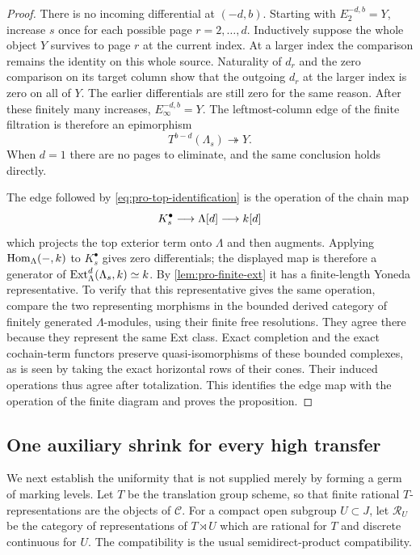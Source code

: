 \begin{proof}
There is no incoming differential at $(-d,b)$.  Starting with
$E_2^{-d,b}=Y$, increase $s$ once for each possible page
$r=2,\ldots,d$.  Inductively suppose the whole object $Y$
survives to page $r$ at the current index.  At a larger index the
comparison remains the identity on this whole source.  Naturality
of $d_r$ and the zero comparison on its target column show that
the outgoing $d_r$ at the larger index is zero on all of $Y$.
The earlier differentials are still zero for the same reason.
After these finitely many increases,
$E_\infty^{-d,b}=Y$.  The leftmost-column edge of the finite
filtration is therefore an epimorphism
\[
 T^{b-d}(\Lambda_s)\twoheadrightarrow Y.
\]
When $d=1$ there are no pages to eliminate, and the same conclusion
holds directly.

The edge followed by \cref{eq:pro-top-identification} is the
operation of the chain map
\[
 K_s^\bullet\longrightarrow\Lambda[d]
                       \longrightarrow k[d]
\]
which projects the top exterior term onto $\Lambda$ and then
augments.  Applying $\operatorname{Hom}_\Lambda(-,k)$ to
$K_s^\bullet$ gives zero differentials; the displayed map is
therefore a generator of
$\operatorname{Ext}^d_\Lambda(\Lambda_s,k)\simeq k$.
By \cref{lem:pro-finite-ext} it has a finite-length Yoneda
representative.  To verify that this representative gives the
same operation, compare the two representing morphisms in the
bounded derived category of finitely generated $\Lambda$-modules,
using their finite free resolutions.  They agree there because
they represent the same Ext class.  Exact completion and the
exact cochain-term functors preserve quasi-isomorphisms of these
bounded complexes, as is seen by taking the exact horizontal
rows of their cones.  Their induced operations thus agree after
totalization.  This identifies the edge map with the operation
of the finite diagram and proves the proposition.
\end{proof}

\subsection{One auxiliary shrink for every high transfer}

We next establish the uniformity that is not supplied merely by
forming a germ of marking levels.  Let $T$ be the translation group
scheme, so that finite rational $T$-representations are the objects
of $\mathcal C$.  For a compact open subgroup $U\subset J$, let
$\mathcal R_U$ be the category of representations of $T\rtimes U$
which are rational for $T$ and discrete continuous for $U$.
The compatibility is the usual semidirect-product compatibility.

